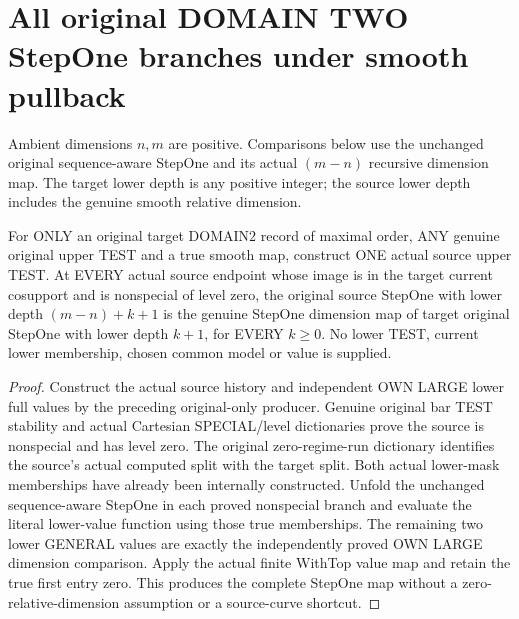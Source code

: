 \section{All original DOMAIN TWO StepOne branches under smooth pullback}

Ambient dimensions $n,m$ are positive. Comparisons below use the unchanged
original sequence-aware StepOne and its actual $(m-n)$ recursive dimension
map. The target lower depth is any positive integer; the source lower depth
includes the genuine smooth relative dimension.

\begin{theorem}
\label{hir:original-domain-two-zero-stepone-all-smooth-values}
\leanok
For ONLY an original target DOMAIN$2$ record of maximal order, ANY genuine
original upper TEST and a true smooth map, construct ONE actual source upper
TEST. At EVERY actual source endpoint whose image is in the target current
cosupport and is nonspecial of level zero, the original source StepOne with
lower depth $(m-n)+k+1$ is the genuine StepOne dimension map of target original
StepOne with lower depth $k+1$, for EVERY $k\ge0$. No lower TEST, current lower
membership, chosen common model or value is supplied.
\end{theorem}
\begin{proof}
Construct the actual source history and independent OWN LARGE lower full
values by the preceding original-only producer. Genuine original bar TEST
stability and actual Cartesian SPECIAL/level dictionaries prove the source
is nonspecial and has level zero. The original zero-regime-run dictionary
identifies the source's actual computed split with the target split. Both
actual lower-mask memberships have already been internally constructed.
Unfold the unchanged sequence-aware StepOne in each proved nonspecial branch
and evaluate the literal lower-value function using those true memberships.
The remaining two lower GENERAL values are exactly the independently proved
OWN LARGE dimension comparison. Apply the actual finite WithTop value map
and retain the true first entry zero. This produces the complete StepOne map
without a zero-relative-dimension assumption or a source-curve shortcut.
\end{proof}

